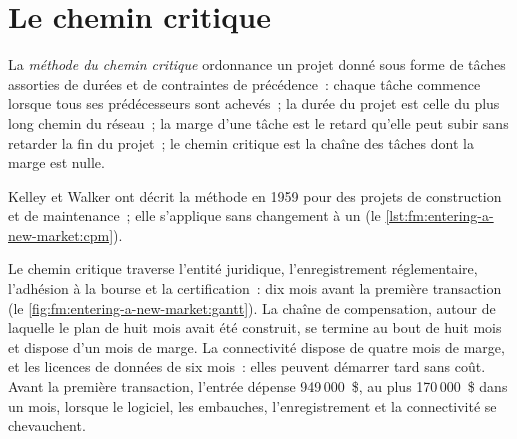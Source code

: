 \section{Le chemin critique}

\begin{definition}\label{def:fm:entering-a-new-market:cpm}
La \emph{méthode du chemin critique} ordonnance un projet donné sous forme de tâches assorties de durées et de contraintes de précédence~: chaque tâche
commence lorsque tous ses prédécesseurs sont achevés~; la durée du projet est celle du plus long chemin du réseau~; la marge d'une tâche est le retard
qu'elle peut subir sans retarder la fin du projet~; le chemin critique est la chaîne des tâches dont la marge est nulle.
\end{definition}

Kelley et Walker ont décrit la méthode en 1959 pour des projets de construction et de maintenance~; elle s'applique sans changement à un 
(le \cref{lst:fm:entering-a-new-market:cpm}).

\label{lst:fm:entering-a-new-market:cpm}

Le chemin critique traverse l'entité juridique, l'enregistrement réglementaire, l'adhésion à la bourse et la certification~: dix mois avant la première
transaction (le \cref{fig:fm:entering-a-new-market:gantt}). La chaîne de compensation, autour de laquelle le plan de huit mois avait été construit, se termine au bout de huit
mois et dispose d'un mois de marge. La connectivité dispose de quatre mois de marge, et les licences de données de six mois~: elles peuvent démarrer tard sans coût. Avant la première
transaction, l'entrée dépense 949\,000~\$, au plus 170\,000~\$ dans un mois, lorsque le logiciel, les embauches, l'enregistrement et la connectivité se chevauchent.

